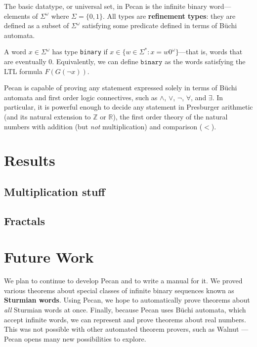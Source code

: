 \documentclass[10pt,usenames,dvipsnames]{article}
\begin{document}
The basic datatype, or universal set, in Pecan is the infinite binary word---elements of $\Sigma^{\omega}$ where $\Sigma = \{0,1\}$.
All types are \textbf{refinement types}: they are defined as a subset of $\Sigma^{\omega}$ satisfying some predicate defined in terms of B\"uchi automata.

\begin{example}
A word $x \in \Sigma^\omega$ has type \texttt{binary} if $x \in \{ w \in \Sigma^* : x = w0^\omega \}$---that is, words that are eventually $0$.
Equivalently, we can define $\texttt{binary}$ as the words satisfying the LTL formula $F(G(\neg x))$.
\end{example}

Pecan is capable of proving any statement expressed solely in terms of B\"uchi automata and first order logic connectives, such as $\wedge$, $\vee$, $\neg$, $\forall$, and $\exists$.
In particular, it is powerful enough to decide any statement in Presburger arithmetic (and its natural extension to $\mathbb{Z}$ or $\mathbb{R}$), the first order theory of the natural numbers with addition (but \emph{not} multiplication) and comparison ($<$).

\section{Results}

\subsection{Multiplication stuff}

\subsection{Fractals}

\section{Future Work}

We plan to continue to develop Pecan and to write a manual for it. 
We proved various theorems about special classes of infinite binary sequences known as \textbf{Sturmian words}.
Using Pecan, we hope to automatically prove theorems about \emph{all} Sturmian words at once.
Finally, because Pecan uses B\"uchi automata, which accept infinite words, we can represent and prove theorems about real numbers.
This was not possible with other automated theorem provers, such as Walnut \cite{walnut}---Pecan opens many new possibilities to explore.

\printbibliography
\end{document}

